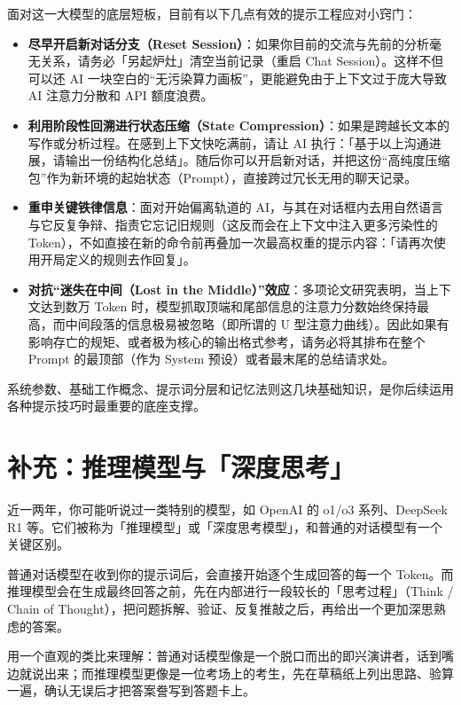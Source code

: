 面对这一大模型的底层短板，目前有以下几点有效的提示工程应对小窍门：

\begin{itemize}
  \item \textbf{尽早开启新对话分支（Reset Session）}：如果你目前的交流与先前的分析毫无关系，请务必「另起炉灶」清空当前记录（重启 Chat Session）。这样不但可以还 AI 一块空白的“无污染算力画板”，更能避免由于上下文过于庞大导致 AI 注意力分散和 API 额度浪费。
  \item \textbf{利用阶段性回溯进行状态压缩（State Compression）}：如果是跨越长文本的写作或分析过程。在感到上下文快吃满前，请让 AI 执行：「基于以上沟通进展，请输出一份结构化总结」。随后你可以开启新对话，并把这份“高纯度压缩包”作为新环境的起始状态（Prompt），直接跨过冗长无用的聊天记录。
  \item \textbf{重申关键铁律信息}：面对开始偏离轨道的 AI，与其在对话框内去用自然语言与它反复争辩、指责它忘记旧规则（这反而会在上下文中注入更多污染性的 Token），不如直接在新的命令前再叠加一次最高权重的提示内容：「请再次使用开局定义的规则去作回复」。
  \item \textbf{对抗“迷失在中间（Lost in the Middle）”效应}：多项论文研究表明，当上下文达到数万 Token 时，模型抓取顶端和尾部信息的注意力分数始终保持最高，而中间段落的信息极易被忽略（即所谓的 U 型注意力曲线）。因此如果有影响存亡的规矩、或者极为核心的输出格式参考，请务必将其排布在整个 Prompt 的最顶部（作为 System 预设）或者最末尾的总结请求处。
\end{itemize}

系统参数、基础工作概念、提示词分层和记忆法则这几块基础知识，是你后续运用各种提示技巧时最重要的底座支撑。

\section{补充：推理模型与「深度思考」}
\label{sec:reasoning-models}

近一两年，你可能听说过一类特别的模型，如 OpenAI 的 o1/o3 系列、DeepSeek R1 等。它们被称为「推理模型」或「深度思考模型」，和普通的对话模型有一个关键区别。

普通对话模型在收到你的提示词后，会直接开始逐个生成回答的每一个 Token。而推理模型会在生成最终回答之前，先在内部进行一段较长的「思考过程」（Think / Chain of Thought），把问题拆解、验证、反复推敲之后，再给出一个更加深思熟虑的答案。

用一个直观的类比来理解：普通对话模型像是一个脱口而出的即兴演讲者，话到嘴边就说出来；而推理模型更像是一位考场上的考生，先在草稿纸上列出思路、验算一遍，确认无误后才把答案誊写到答题卡上。

